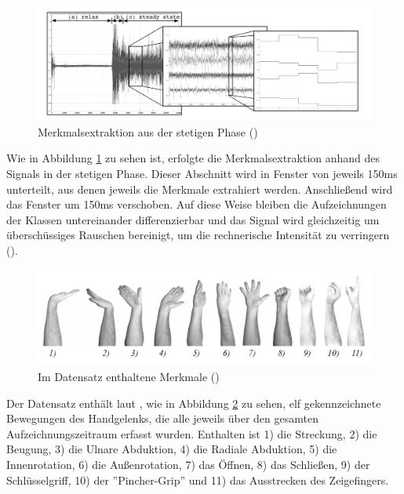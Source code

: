 \begin{figure}[h]
	\begin{center}
	\includegraphics[scale=0.4]{grafiken/feature-extraction.png}
	\caption{Merkmalsextraktion aus der stetigen Phase (\cite{Kaufmann2013Data})}
	\label{feature-extraction}
	\end{center}
\end{figure}

Wie in Abbildung \ref{feature-extraction} zu sehen ist, erfolgte die Merkmalsextraktion anhand des Signals in der stetigen Phase.
Dieser Abschnitt wird in Fenster von jeweils 150ms unterteilt, aus denen jeweils die Merkmale extrahiert werden. Anschließend wird das Fenster um 150ms verschoben. Auf diese Weise bleiben die Aufzeichnungen der Klassen untereinander differenzierbar und das Signal wird gleichzeitig um überschüssiges Rauschen bereinigt, um die rechnerische Intensität zu verringern (\cite{Kaufmann2013Data}). 


\begin{figure}[ht]
	\begin{center}
	\includegraphics[scale=0.5]{grafiken/11classes.png}
	\caption{Im Datensatz enthaltene Merkmale (\cite{Kaufmann2013Data})}
	\label{bewegungsklassen}
	\end{center}
\end{figure}


Der Datensatz enthält laut \cite{Kaufmann2013Data}, wie in Abbildung \ref{bewegungsklassen} zu sehen, elf gekennzeichnete Bewegungen des Handgelenks, die alle jeweils über den gesamten Aufzeichnungszeitraum erfasst wurden. Enthalten ist 1) die Streckung, 2) die Beugung, 3) die Ulnare Abduktion, 4) die Radiale Abduktion, 5) die Innenrotation, 6) die Außenrotation, 7) das Öffnen, 8) das Schließen, 9) der Schlüsselgriff, 10) der ''Pincher-Grip'' und 11) das Ausstrecken des Zeigefingers.

